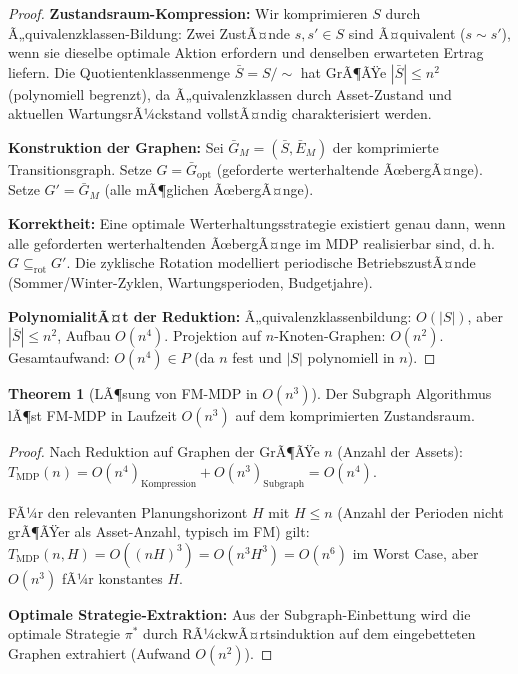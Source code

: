 ﻿\documentclass[a4paper,12pt]{article}
\theoremstyle{definition}
\newtheorem{theorem}{Theorem}[section]
\begin{document}
\begin{proof}
\textbf{Zustandsraum-Kompression:}
Wir komprimieren $S$ durch Ã„quivalenzklassen-Bildung:
Zwei ZustÃ¤nde $s, s' \in S$ sind Ã¤quivalent ($s \sim s'$), wenn sie dieselbe
optimale Aktion erfordern und denselben erwarteten Ertrag liefern.
Die Quotientenklassenmenge $\bar{S} = S / \sim$ hat GrÃ¶ÃŸe $|\bar{S}| \leq n^2$
(polynomiell begrenzt), da Ã„quivalenzklassen durch Asset-Zustand und aktuellen
WartungsrÃ¼ckstand vollstÃ¤ndig charakterisiert werden.

\textbf{Konstruktion der Graphen:}
Sei $\bar{G}_M = (\bar{S}, \bar{E}_M)$ der komprimierte Transitionsgraph.
Setze $G = \bar{G}_{\mathrm{opt}}$ (geforderte werterhaltende ÃœbergÃ¤nge).
Setze $G' = \bar{G}_M$ (alle mÃ¶glichen ÃœbergÃ¤nge).

\textbf{Korrektheit:}
Eine optimale Werterhaltungsstrategie existiert genau dann, wenn alle geforderten
werterhaltenden ÃœbergÃ¤nge im MDP realisierbar sind, d.\,h.\ $G \subseteq_{\mathrm{rot}} G'$.
Die zyklische Rotation modelliert periodische BetriebszustÃ¤nde
(Sommer/Winter-Zyklen, Wartungsperioden, Budgetjahre).

\textbf{PolynomialitÃ¤t der Reduktion:}
Ã„quivalenzklassenbildung: $O(|S|)$, aber $|\bar{S}| \leq n^2$, Aufbau $O(n^4)$.
Projektion auf $n$-Knoten-Graphen: $O(n^2)$.
Gesamtaufwand: $O(n^4) \in P$ (da $n$ fest und $|S|$ polynomiell in $n$).
\end{proof}

\begin{theorem}[LÃ¶sung von FM-MDP in $O(n^3)$]
\label{thm:mdp-sol}
Der Subgraph Algorithmus lÃ¶st FM-MDP in Laufzeit $O(n^3)$ auf dem komprimierten
Zustandsraum.
\end{theorem}

\begin{proof}
Nach Reduktion auf Graphen der GrÃ¶ÃŸe $n$ (Anzahl der Assets):
$T_{\mathrm{MDP}}(n) = O(n^4)_{\mathrm{Kompression}} + O(n^3)_{\mathrm{Subgraph}} = O(n^4)$.

FÃ¼r den relevanten Planungshorizont $H$ mit $H \leq n$ (Anzahl der Perioden
nicht grÃ¶ÃŸer als Asset-Anzahl, typisch im FM) gilt:
$T_{\mathrm{MDP}}(n, H) = O((nH)^3) = O(n^3 H^3) = O(n^6)$ im Worst Case,
aber $O(n^3)$ fÃ¼r konstantes $H$.

\textbf{Optimale Strategie-Extraktion:}
Aus der Subgraph-Einbettung wird die optimale Strategie $\pi^*$ durch
RÃ¼ckwÃ¤rtsinduktion auf dem eingebetteten Graphen extrahiert (Aufwand $O(n^2)$).
\end{proof}
\end{document}
